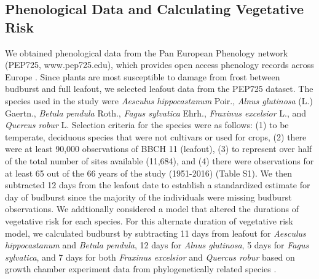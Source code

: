 \documentclass{article}\usepackage[]{graphicx}\usepackage[]{color}
\begin{document}
\subsection*{Phenological Data and Calculating Vegetative Risk}
We obtained phenological data from the Pan European Phenology network (PEP725, www.pep725.edu), which provides open access phenology records across Europe \citep{Templ2018}. Since plants are most susceptible to damage from frost between budburst and full leafout, we selected leafout data \citep[i.e., in][BBCH 11, which is defined as the point of leaf unfolding and the first visible leaf stalk]{Meier2001} from the PEP725 dataset. The species used in the study were \textit{Aesculus hippocastanum} Poir., \textit{Alnus glutinosa} (L.) Gaertn., \textit{Betula pendula} Roth., \textit{Fagus sylvatica} Ehrh., \textit{Fraxinus excelsior} L., and \textit{Quercus robur} L. Selection criteria for the species were as follows: (1) to be temperate, deciduous species that were not cultivars or used for crops, (2) there were at least 90,000 observations of BBCH 11 (leafout), (3) to represent over half of the total number of sites available (11,684), and (4) there were observations for at least 65 out of the 66 years of the study (1951-2016) (Table S1). We then subtracted 12 days from the leafout date to establish a standardized estimate for day of budburst \citep{Donnelly2017, Flynn2018, NPN2019} since the majority of the individuals were missing budburst observations. 
We addtionally considered a model that altered the durations of vegetative risk for each species. For this alternate duration of vegetative risk model, we calculated budburst by subtracting 11 days from leafout for \textit{Aesculus hippocastanum} and \textit{Betula pendula}, 12 days for \textit{Alnus glutinosa}, 5 days for \textit{Fagus sylvatica}, and 7 days for both \textit{Fraxinus excelsior} and \textit{Quercus robur} based on growth chamber experiment data from phylogenetically related species \citep{Buerki2010, Wang2016, Hipp2017, Flynn2018}.
\end{document}
